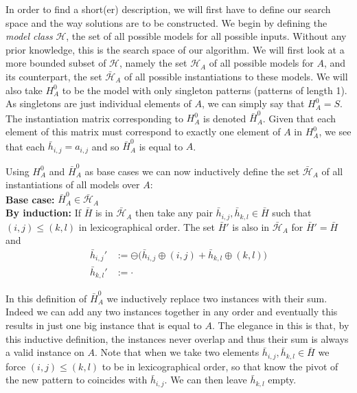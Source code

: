 \documentclass{llncs}
\begin{document}
In order to find a short(er) description, we will first have to define our search space and the way solutions are to be constructed. We begin by defining the \emph{model class} $\mathcal{H}$, the set of all possible models for all possible inputs. Without any prior knowledge, this is the search space of our algorithm. We will first look at a more bounded subset of $\mathcal{H}$, namely the set $\mathcal{H}_A$ of all possible models for $A$, and its counterpart, the set $\bar{\mathcal{H}}_A$ of all possible instantiations to these models. We will also take $H_A^0$ to be the model with only singleton patterns (patterns of length 1). As singletons are just individual elements of $A$, we can simply say that $H_A^0=S$. The instantiation matrix corresponding to $H_A^0$ is denoted $\bar{H}_A^0$. Given that each element of this matrix must correspond to exactly one element of $A$ in $H_A^0$, we see that each $\bar{h}_{i,j} = a_{i,j}$ and so $\bar{H}_A^0$ is equal to $A$. 

Using $H_A^0$ and $\bar{H}_A^0$ as base cases we can now inductively define the set $\bar{\mathcal{H}}_A$ of all instantiations of all models over $A$:\\
\textbf{Base case:} $\bar{H}_A^0 \in \bar{\mathcal{H}}_A$\\
\textbf{By induction:} If $\bar{H}$ is in $\bar{\mathcal{H}}_A$ then take any pair $\bar{h}_{i,j},\bar{h}_{k,l} \in \bar{H}$ such that $(i,j)\leq(k,l)$ in lexicographical order. The set $\bar{H}'$ is also in $\bar{\mathcal{H}}_A$ for $\bar{H}' = \bar{H}$ and
\begin{align*}
\bar{h}_{i,j}' &:= \ominus \big( \bar{h}_{i,j} \oplus (i,j) + \bar{h}_{k,l} \oplus (k,l) \big) \\
\bar{h}_{k,l}' &:= \cdot
\end{align*}

In this definition of $\bar{H}_A^0$ we inductively replace two instances with their sum. Indeed we can add any two instances together in any order and eventually this results in just one big instance that is equal to $A$. The elegance in this is that, by this inductive definition, the instances never overlap and thus their sum is always a valid instance on $A$. Note that when we take two elements $\bar{h}_{i,j},\bar{h}_{k,l} \in \bar{H}$ we force $(i,j)\leq(k,l)$ to be in lexicographical order, so that know the pivot of the new pattern to coincides with $\bar{h}_{i,j}$. We can then leave $\bar{h}_{k,l}$ empty.
\end{document}
